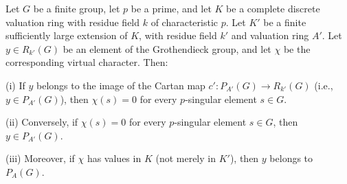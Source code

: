 Let $G$ be a finite group, let $p$ be a prime, and let $K$ be a complete discrete valuation ring with residue field $k$ of characteristic $p$. Let $K'$ be a finite sufficiently large extension of $K$, with residue field $k'$ and valuation ring $A'$. Let $y \in R_{k'}(G)$ be an element of the Grothendieck group, and let $\chi$ be the corresponding virtual character. Then:

(i) If $y$ belongs to the image of the Cartan map $c': P_{A'}(G) \to R_{k'}(G)$ (i.e., $y \in P_{A'}(G)$), then $\chi(s) = 0$ for every $p$-singular element $s \in G$.

(ii) Conversely, if $\chi(s) = 0$ for every $p$-singular element $s \in G$, then $y \in P_{A'}(G)$.

(iii) Moreover, if $\chi$ has values in $K$ (not merely in $K'$), then $y$ belongs to $P_A(G)$.
